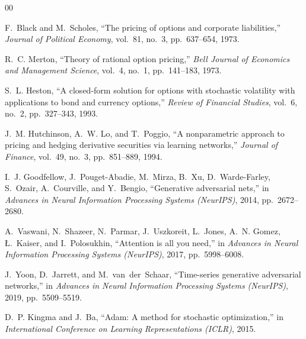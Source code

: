 \documentclass[conference]{IEEEtran}
\begin{document}
\begin{thebibliography}{00}

F.~Black and M.~Scholes, ``The pricing of options and corporate
liabilities,'' \emph{Journal of Political Economy}, vol.~81,
no.~3, pp.~637--654, 1973.

R.~C. Merton, ``Theory of rational option pricing,''
\emph{Bell Journal of Economics and Management Science},
vol.~4, no.~1, pp.~141--183, 1973.

S.~L. Heston, ``A closed-form solution for options with
stochastic volatility with applications to bond and currency
options,'' \emph{Review of Financial Studies}, vol.~6,
no.~2, pp.~327--343, 1993.

J.~M. Hutchinson, A.~W. Lo, and T.~Poggio, ``A nonparametric
approach to pricing and hedging derivative securities via
learning networks,'' \emph{Journal of Finance}, vol.~49,
no.~3, pp.~851--889, 1994.

I.~J. Goodfellow, J.~Pouget-Abadie, M.~Mirza, B.~Xu,
D.~Warde-Farley, S.~Ozair, A.~Courville, and Y.~Bengio,
``Generative adversarial nets,'' in \emph{Advances in Neural
Information Processing Systems (NeurIPS)}, 2014, pp.~2672--2680.

A.~Vaswani, N.~Shazeer, N.~Parmar, J.~Uszkoreit, L.~Jones,
A.~N. Gomez, {\L}.~Kaiser, and I.~Polosukhin, ``Attention is
all you need,'' in \emph{Advances in Neural Information
Processing Systems (NeurIPS)}, 2017, pp.~5998--6008.

J.~Yoon, D.~Jarrett, and M.~van~der~Schaar, ``Time-series
generative adversarial networks,'' in \emph{Advances in Neural
Information Processing Systems (NeurIPS)}, 2019, pp.~5509--5519.

D.~P. Kingma and J.~Ba, ``Adam: A method for stochastic
optimization,'' in \emph{International Conference on Learning
Representations (ICLR)}, 2015.

\end{thebibliography}
\end{document}
